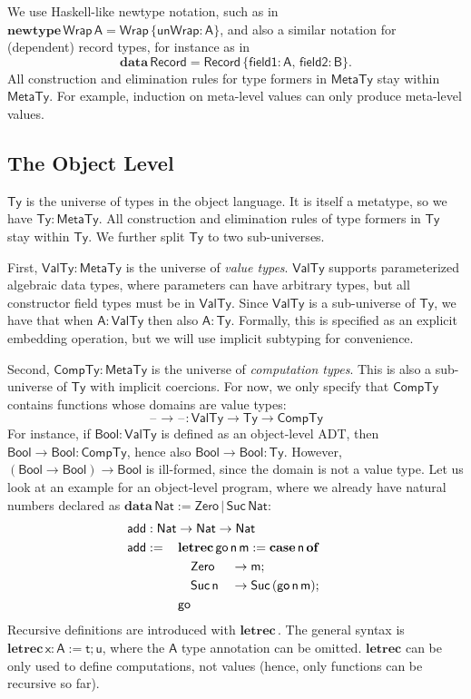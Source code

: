 \documentclass[acmsmall]{acmart}
\newcommand{\mit}[1]{{\mathsf{#1}}}
\newcommand{\msf}[1]{{\mathsf{#1}}}
\newcommand{\mbf}[1]{{\mathbf{#1}}}
\newcommand{\bs}[1]{\boldsymbol{#1}}
\newcommand{\ind}{\hspace{1em}}
\newcommand{\data}{\mbf{data}\,}
\newcommand{\letrec}{\mbf{letrec}\,}
\newcommand{\of}{\mbf{of}\,}
\newcommand{\go}{\mit{go}}
\newcommand{\add}{\mit{add}}
\newcommand{\vm}{\mathsf{m}}
\newcommand{\vn}{\mathsf{n}}
\newcommand{\vA}{\mathsf{A}}
\newcommand{\vB}{\mathsf{B}}
\newcommand{\vx}{\mathsf{x}}
\newcommand{\vt}{\mathsf{t}}
\newcommand{\vu}{\mathsf{u}}
\newcommand{\Bool}{\msf{Bool}}
\newcommand{\case}{\mbf{case\,}}
\newcommand{\MTy}{\msf{MetaTy}}
\newcommand{\VTy}{\msf{ValTy}}
\newcommand{\Ty}{\msf{Ty}}
\newcommand{\CTy}{\msf{CompTy}}
\newcommand{\blank}{{\mathord{\hspace{1pt}\text{--}\hspace{1pt}}}}
\newcommand{\Nat}{\msf{Nat}}
\newcommand{\Zero}{\msf{Zero}}
\newcommand{\Suc}{\msf{Suc}}
\theoremstyle{remark}
\newcommand{\newtype}{\mbf{newtype}\,}
\begin{document}
We use Haskell-like newtype notation, such as in $\newtype \msf{Wrap}\,\vA =
\msf{Wrap}\,\{\mit{unWrap} : \vA \}$, and also a similar notation for (dependent)
record types, for instance as in
\[\data \msf{Record} = \msf{Record}\,\{\mit{field1} : \vA,\,\mit{field2} : \vB\}.\]
All construction and elimination rules for type formers in $\MTy$ stay within
$\MTy$. For example, induction on meta-level values can only produce meta-level
values.

\subsection{The Object Level}\label{sec:the-object-level}

$\bs{\Ty}$ is the universe of types in the object language. It is itself a
metatype, so we have $\Ty : \MTy$. All construction and elimination rules of
type formers in $\Ty$ stay within $\Ty$. We further split $\Ty$ to two
sub-universes.

First, $\bs{\VTy} : \MTy$ is the universe of \emph{value types}. $\VTy$ supports
parameterized algebraic data types, where parameters can have arbitrary types,
but all constructor field types must be in $\VTy$. Since $\VTy$ is a
sub-universe of $\Ty$, we have that when $\vA : \VTy$ then also $\vA :
\Ty$. Formally, this is specified as an explicit embedding operation, but we
will use implicit subtyping for convenience.

Second, $\bs{\CTy} : \MTy$ is the universe of \emph{computation types}. This is
also a sub-universe of $\Ty$ with implicit coercions. For now, we only specify
that $\CTy$ contains functions whose domains are value types:
\[ \blank\to\blank : \VTy \to \Ty \to \CTy \]
For instance, if $\Bool : \VTy$ is defined as an object-level ADT, then $\Bool
\to \Bool : \CTy$, hence also $\Bool \to \Bool : \Ty$. However, $(\Bool \to
\Bool) \to \Bool$ is ill-formed, since the domain is not a value type. Let us look at an
example for an object-level program, where we already have natural numbers
declared as $\data \Nat := \Zero\,|\,\Suc\,\Nat$:
\begin{alignat*}{3}
  &\hspace{-1em}\rlap{$\add : \Nat \to \Nat \to \Nat$}\\
  &\hspace{-1em}\add :=\,&& \mathrlap{\letrec \go\,\vn\,\vm := \case \vn\,\of}\\
  &\hspace{-1em}         && \ind \Zero     &&\to \vm;\\
  &\hspace{-1em}         && \ind \Suc\,\vn &&\to \Suc\,(\go\,\vn\,\vm);\\
  &\hspace{-1em}         && \go
\end{alignat*}
Recursive definitions are introduced with $\letrec$. The general syntax is
$\letrec \vx : \vA := \vt; \vu$, where the $\vA$ type annotation can be
omitted. $\mbf{letrec}$ can be only used to define computations, not values
(hence, only functions can be recursive so far).
\end{document}
